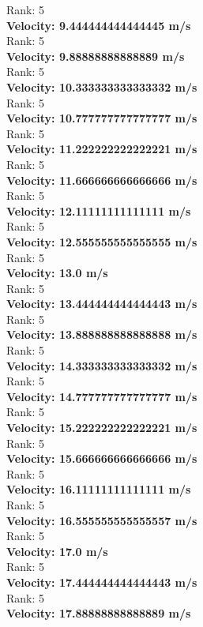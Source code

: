 \documentclass{article}
\begin{document}
Rank: 5\\
\textbf{Velocity: 9.444444444444445 m/s}\\
Rank: 5\\
\textbf{Velocity: 9.88888888888889 m/s}\\
Rank: 5\\
\textbf{Velocity: 10.333333333333332 m/s}\\
Rank: 5\\
\textbf{Velocity: 10.777777777777777 m/s}\\
Rank: 5\\
\textbf{Velocity: 11.222222222222221 m/s}\\
Rank: 5\\
\textbf{Velocity: 11.666666666666666 m/s}\\
Rank: 5\\
\textbf{Velocity: 12.11111111111111 m/s}\\
Rank: 5\\
\textbf{Velocity: 12.555555555555555 m/s}\\
Rank: 5\\
\textbf{Velocity: 13.0 m/s}\\
Rank: 5\\
\textbf{Velocity: 13.444444444444443 m/s}\\
Rank: 5\\
\textbf{Velocity: 13.888888888888888 m/s}\\
Rank: 5\\
\textbf{Velocity: 14.333333333333332 m/s}\\
Rank: 5\\
\textbf{Velocity: 14.777777777777777 m/s}\\
Rank: 5\\
\textbf{Velocity: 15.222222222222221 m/s}\\
Rank: 5\\
\textbf{Velocity: 15.666666666666666 m/s}\\
Rank: 5\\
\textbf{Velocity: 16.11111111111111 m/s}\\
Rank: 5\\
\textbf{Velocity: 16.555555555555557 m/s}\\
Rank: 5\\
\textbf{Velocity: 17.0 m/s}\\
Rank: 5\\
\textbf{Velocity: 17.444444444444443 m/s}\\
Rank: 5\\
\textbf{Velocity: 17.88888888888889 m/s}\\
\end{document}
